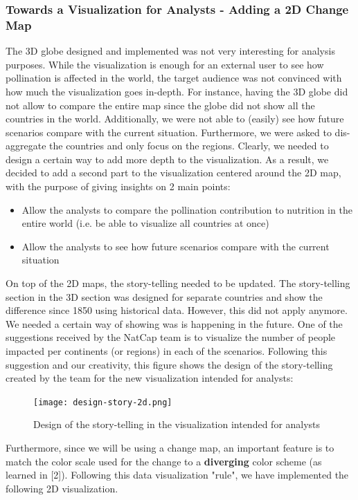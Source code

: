 \documentclass[12pt]{article}
\begin{document}
\subsubsection{Towards a Visualization for Analysts - Adding a 2D Change Map}
The 3D globe designed and implemented was not very interesting for analysis purposes. While the visualization is enough for an external user to see how pollination is affected in the world, the target audience was not convinced with how much the visualization goes in-depth. For instance, having the 3D globe did not allow to compare the entire map since the globe did not show all the countries in the world. Additionally, we were not able to (easily) see how future scenarios compare with the current situation. Furthermore, we were asked to dis-aggregate the countries and only focus on the regions. Clearly, we needed to design a certain way to add more depth to the visualization. \newline
As a result, we decided to add a second part to the visualization centered around the 2D map, with the purpose of giving insights on 2 main points: \newline
\begin{itemize}
    \item Allow the analysts to compare the pollination contribution to nutrition in the entire world (i.e. be able to visualize all countries at once)
    \item Allow the analysts to see how future scenarios compare with the current situation
\end{itemize}
On top of the 2D maps, the story-telling needed to be updated. The story-telling section in the 3D section was designed for separate countries and show the difference since 1850 using historical data. However, this did not apply anymore. We needed a certain way of showing was is happening in the future. One of the suggestions received by the NatCap team is to visualize the number of people impacted per continents (or regions) in each of the scenarios. Following this suggestion and our creativity, this figure shows the design of the story-telling created by the team for the new visualization intended for analysts: 
\begin{figure}[h]
\centering
\texttt{[image: design-story-2d.png]}
\caption{Design of the story-telling in the visualization intended for analysts}
\end{figure} 
Furthermore, since we will be using a change map, an important feature is to match the color scale used for the change to a \textbf{diverging} color scheme (as learned in [2]). Following this data visualization "rule", we have implemented the following 2D visualization. 
\end{document}
